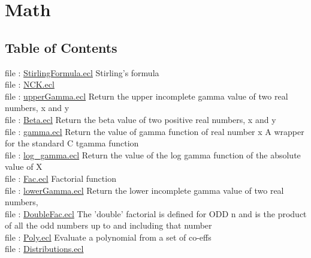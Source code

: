 \chapter*{Math}
\hypertarget{ML_Core/Math}{}


\section*{Table of Contents}
file : \hyperlink{ML_Core.Math.StirlingFormula}{StirlingFormula.ecl}  Stirling's formula \\
file : \hyperlink{ML_Core.Math.NCK}{NCK.ecl}   \\
file : \hyperlink{ML_Core.Math.upperGamma}{upperGamma.ecl}  Return the upper incomplete gamma value of two real numbers, x and y \\
file : \hyperlink{ML_Core.Math.Beta}{Beta.ecl}  Return the beta value of two positive real numbers, x and y \\
file : \hyperlink{ML_Core.Math.gamma}{gamma.ecl}  Return the value of gamma function of real number x A wrapper for the standard C tgamma function \\
file : \hyperlink{ML_Core.Math.log_gamma}{log\_gamma.ecl}  Return the value of the log gamma function of the absolute value of X \\
file : \hyperlink{ML_Core.Math.Fac}{Fac.ecl}  Factorial function \\
file : \hyperlink{ML_Core.Math.lowerGamma}{lowerGamma.ecl}  Return the lower incomplete gamma value of two real numbers, \\
file : \hyperlink{ML_Core.Math.DoubleFac}{DoubleFac.ecl}  The 'double' factorial is defined for ODD n and is the product of all the odd numbers up to and including that number \\
file : \hyperlink{ML_Core.Math.Poly}{Poly.ecl}  Evaluate a polynomial from a set of co-effs \\
file : \hyperlink{ML_Core.Math.Distributions}{Distributions.ecl}   \\












